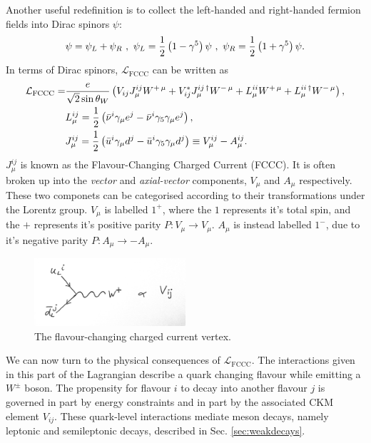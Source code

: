 Another useful redefinition is to collect the left-handed and right-handed fermion fields into Dirac spinors $\psi$:
\begin{align}
  \psi = \psi_L + \psi_R \,\,,\,\, \psi_L = {1\over 2}\left(1-\gamma^5 \right) \psi \,\,,\,\, \psi_R = {1\over 2}\left(1+\gamma^5\right) \psi.
\end{align}
In terms of Dirac spinors, $\mathcal{L}_{\text{FCCC}}$ can be written as
\begin{align}
  \mathcal{L}_{\text{FCCC}} =& {e \over \sqrt{2} \sin \theta_W} \left( V_{ij} J^{ij}_{\mu} W^{+\,\mu} + V^*_{ij} J^{ij\,\dagger}_{\mu} W^{-\,\mu} +
  L^{ii}_{\mu} W^{+\,\mu} + L^{ii\,\dagger}_{\mu} W^{-\,\mu}
  \right), \\ \nonumber
  &L^{ij}_{\mu} = {1\over2}\left(\bar{\nu}^i \gamma_{\mu} e^j - \bar{\nu}^i \gamma_5 \gamma_{\mu} e^j\right), \\ \nonumber
  &J^{ij}_{\mu} = {1\over2}\left(\bar{u}^i \gamma_{\mu} d^j - \bar{u}^i \gamma_5 \gamma_{\mu} d^j\right) \equiv V^{ij}_{\mu} - A^{ij}_{\mu}.
\end{align}
$J^{ij}_{\mu}$ is known as the Flavour-Changing Charged Current (FCCC). It is often broken up into the {\it{vector}} and {\it{axial-vector}} components, $V_{\mu}$ and $A_{\mu}$ respectively. These two componets can be categorised according to their transformations under the Lorentz group. $V_{\mu}$ is labelled $1^+$, where the $1$ represents it's total spin, and the $+$ represents it's positive parity $P: V_{\mu} \to V_{\mu}$. $A_{\mu}$ is instead labelled $1^-$, due to it's negative parity $P: A_{\mu} \to - A_{\mu}$.

\begin{figure}[tb!]
  \begin{center}
    \vspace{-10pt}
    \includegraphics[width=0.5\textwidth]{images/fccc.jpg}
    \vspace{-10pt}
  \end{center}
  \caption{The flavour-changing charged current vertex.}
  \label{fig:fccc}
\end{figure}

We can now turn to the physical consequences of $\mathcal{L}_{\text{FCCC}}$. The interactions given in this part of the Lagrangian describe a quark changing flavour while emitting a $W^{\pm}$ boson. The propensity for flavour $i$ to decay into another flavour $j$ is governed in part by energy constraints and in part by the associated CKM element $V_{ij}$. These quark-level interactions mediate meson decays, namely leptonic and semileptonic decays, described in Sec. \ref{sec:weakdecays}.

